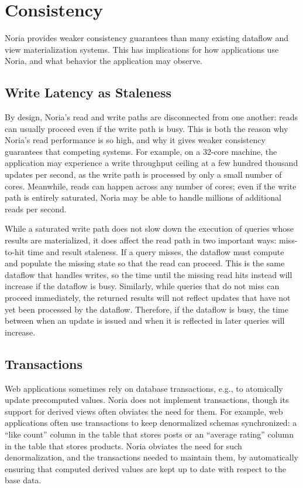 \section{Consistency}

Noria provides weaker consistency guarantees than many existing dataflow and
view materialization systems. This has implications for how applications use
Noria, and what behavior the application may observe.

\subsection{Write Latency as Staleness}

By design, Noria's read and write paths are disconnected from one another: reads
can usually proceed even if the write path is busy. This is both the reason why
Noria's read performance is so high, and why it gives weaker consistency
guarantees that competing systems. For example, on a 32-core machine, the
application may experience a write throughput ceiling at a few hundred thousand
updates per second, as the write path is processed by only a small number of
cores. Meanwhile, reads can happen across any number of cores; even if the write
path is entirely saturated, Noria may be able to handle millions of additional
reads per second.

While a saturated write path does not slow down the execution of queries whose
results are materialized, it does affect the read path in two important ways:
miss-to-hit time and result staleness. If a query misses, the dataflow must
compute and populate the missing state so that the read can proceed. This is the
same dataflow that handles writes, so the time until the missing read hits
instead will increase if the dataflow is busy. Similarly, while queries that do
not miss can proceed immediately, the returned results will not reflect updates
that have not yet been processed by the dataflow. Therefore, if the dataflow is
busy, the time between when an update is issued and when it is reflected in
later queries will increase.

\subsection{Transactions}

Web applications sometimes rely on database transactions, e.g., to atomically
update precomputed values. Noria does not implement transactions, though its
support for derived views often obviates the need for them. For example, web
applications often use transactions to keep denormalized schemas synchronized: a
``like count'' column in the table that stores posts or an ``average rating''
column in the table that stores products. Noria obviates the need for such
denormalization, and the transactions needed to maintain them, by automatically
ensuring that computed derived values are kept up to date with respect to the
base data.


